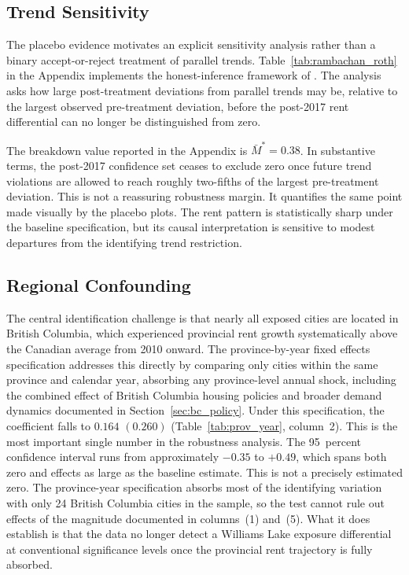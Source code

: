 \documentclass[12pt]{article}
\begin{document}
\subsection{Trend Sensitivity}
\label{sec:rambachan_roth}

The placebo evidence motivates an explicit sensitivity analysis rather than a
binary accept-or-reject treatment of parallel trends.
Table~\ref{tab:rambachan_roth} in the Appendix implements the honest-inference
framework of \citet{rambachan2023}. The analysis asks how large post-treatment
deviations from parallel trends may be, relative to the largest observed
pre-treatment deviation, before the post-2017 rent differential can no longer be
distinguished from zero.

The breakdown value reported in the Appendix is $\bar{M}^{*}=0.38$. In
substantive terms, the post-2017 confidence set ceases to exclude zero once
future trend violations are allowed to reach roughly two-fifths of the largest
pre-treatment deviation. This is not a reassuring robustness margin. It
quantifies the same point made visually by the placebo plots. The rent pattern is
statistically sharp under the baseline specification, but its causal
interpretation is sensitive to modest departures from the identifying trend
restriction.

\subsection{Regional Confounding}
\label{sec:prov_year_fe}

The central identification challenge is that nearly all exposed cities are located
in British Columbia, which experienced provincial rent growth systematically above
the Canadian average from 2010 onward. The province-by-year fixed effects
specification addresses this directly by comparing only cities within the same
province and calendar year, absorbing any province-level annual shock, including
the combined effect of British Columbia housing policies and broader demand dynamics documented
in Section~\ref{sec:bc_policy}. Under this specification, the coefficient falls
to $0.164$ $(0.260)$ (Table~\ref{tab:prov_year}, column~2). This is the most
important single number in the robustness analysis. The 95~percent confidence
interval runs from approximately $-0.35$ to $+0.49$, which spans both zero and
effects as large as the baseline estimate. This is not a precisely estimated
zero. The province-year specification absorbs most of the identifying variation
with only 24 British Columbia cities in the sample, so the test cannot rule out
effects of the magnitude documented in columns~(1) and~(5). What it does
establish is that the data no longer detect a Williams Lake exposure differential
at conventional significance levels once the provincial rent trajectory is fully
absorbed.
\end{document}
